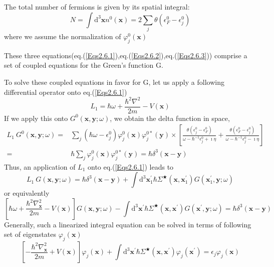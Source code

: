 The total number of fermions is given by its spatial integral:
\[ N = \int \mathrm{d}^{3}\mathbf{x} n^{0}(\mathbf{x}) = 2 \sum_{j} \theta(\epsilon_{F}^{0}-\epsilon_{j}^{0}) \]
where we assume the normalization of $\varphi_{j}^{0}(\mathbf{x})$

These three equations(eq.(\ref{Eqs2.6.1}),eq.(\ref{Eqs2.6.2}),eq.(\ref{Eqs2.6.3})) comprise a set of coupled equations for the Green's function G.

To solve these coupled equations in favor for G, let us apply a following differential operator onto eq.(\ref{Eqs2.6.1})
\[ L_{1} = \hbar \omega + \frac{\hbar^{2}\nabla^{2}}{2m} - V(\mathbf{x})\]
If we apply this onto $G^{0}(\mathbf{x},\mathbf{y};\omega)$, we obtain the delta function in space,
\[\begin{split} L_{1} \ G^{0}(\mathbf{x},\mathbf{y};\omega) =& \sum_{j}(\hbar\omega - \epsilon_{j}^{0})\varphi_{j}^{0}(\mathbf{x})\varphi_{j}^{0*}(\mathbf{y})
 \times \left[
\frac{\theta(\epsilon_{j}^{0}-\epsilon_{F}^{0})}{\omega-\hbar^{-1}\epsilon_{j}^{0}+\imath\eta} +\frac{\theta(\epsilon_{F}^{0}-\epsilon_{j}^{0})}{\omega-\hbar^{-1}\epsilon_{j}^{0}-\imath\eta}
 \right]\\
=& \hbar \sum_{j} \varphi_{j}^{0}(\mathbf{x})\varphi_{j}^{0*}(\mathbf{y}) = \hbar \delta^{3}(\mathbf{x}-\mathbf{y})
\end{split} \]
Thus, an application of $L_{1}$ onto eq.(\ref{Eqs2.6.1}) leads to
\[ L_{1} \ G(\mathbf{x},\mathbf{y};\omega) = \hbar\delta^{3}(\mathbf{x}-\mathbf{y}) + \int \mathrm{d}^{3}\mathbf{x}_{1}^{'} 
\hbar\Sigma^{\bigstar}(\mathbf{x},\mathbf{x}_{1}^{'})G(\mathbf{x}_{1}^{'},\mathbf{y};\omega) \]
or equivalently
\begin{equation}\label{Eqs2.6.4}
\left[ \hbar\omega + \frac{\hbar^{2}\nabla^{2}_{\mathbf{x}}}{2m} - V(\mathbf{x}) \right] G(\mathbf{x},\mathbf{y};\omega) - \int \mathrm{d}^{3} \mathbf{x}^{'} \hbar \Sigma^{\bigstar}(\mathbf{x},\mathbf{x}^{'})G(\mathbf{x}^{'},\mathbf{y};\omega) = \hbar\delta^{3}(\mathbf{x}-\mathbf{y})
\end{equation}
Generally, such a linearized integral equation can be solved in terms of following set of eigenstates $\varphi_{j}(\mathbf{x})$
\begin{equation} \label{Eqs2.6.5}
 \left[ -\frac{\hbar^{2}\nabla^{2}_{\mathbf{x}}}{2m} + V(\mathbf{x}) \right]\varphi_{j}(\mathbf{x})+\int \mathrm{d}^{3} \mathbf{x}^{'} \hbar \Sigma^{\bigstar}(\mathbf{x},\mathbf{x}^{'})\varphi_{j}(\mathbf{x}^{'})=\epsilon_{j}\varphi_{j}(\mathbf{x}) \end{equation}

